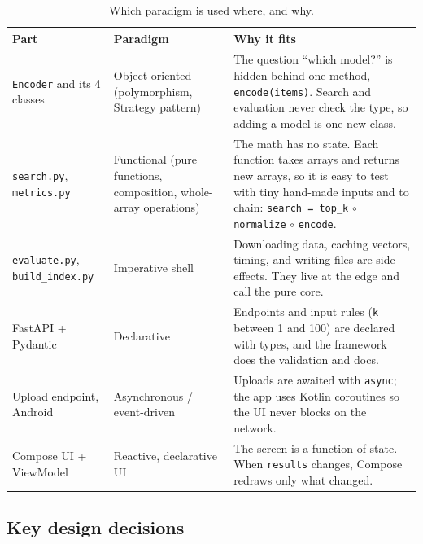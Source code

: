 \documentclass{article}
\begin{document}
\begin{table}[h]
\centering\small
\caption{Which paradigm is used where, and why.}
\label{tab:paradigms}
\begin{tabular}{@{}p{2.5cm}p{3.1cm}p{7cm}@{}}
\toprule
Part & Paradigm & Why it fits \\
\midrule
\texttt{Encoder} and its 4 classes & Object-oriented (polymorphism, Strategy pattern) & The question ``which model?'' is hidden behind one method, \texttt{encode(items)}. Search and evaluation never check the type, so adding a model is one new class. \\
\texttt{search.\allowbreak py}, \texttt{metrics.\allowbreak py} & Functional (pure functions, composition, whole-array operations) & The math has no state. Each function takes arrays and returns new arrays, so it is easy to test with tiny hand-made inputs and to chain: \texttt{search = top\_k} $\circ$ \texttt{normalize} $\circ$ \texttt{encode}. \\
\texttt{evaluate.\allowbreak py}, \texttt{build\_index.py} & Imperative shell & Downloading data, caching vectors, timing, and writing files are side effects. They live at the edge and call the pure core. \\
FastAPI + Pydantic & Declarative & Endpoints and input rules (\texttt{k} between 1 and 100) are declared with types, and the framework does the validation and docs. \\
Upload endpoint, Android & Asynchronous / event-driven & Uploads are awaited with \texttt{async}; the app uses Kotlin coroutines so the UI never blocks on the network. \\
Compose UI + ViewModel & Reactive, declarative UI & The screen is a function of state. When \texttt{results} changes, Compose redraws only what changed. \\
\bottomrule
\end{tabular}
\end{table}

\subsection{Key design decisions}
\end{document}
